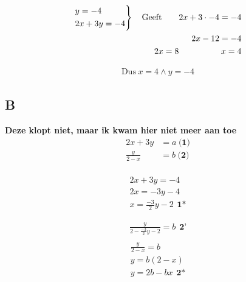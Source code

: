 \documentclass[fleqn]{article}
\begin{document}
\begin{align*} 
\begin{rcases*}
y = -4\\
2x + 3y = -4\\
\end{rcases*}
\hspace{10pt}\text{Geeft}\hspace{20pt}2x + 3\cdot-4 = -4 \\ 
\hspace{50pt}2x -12 = -4 \\ 
\hspace{50pt}2x = 8
\hspace{50pt}x=4
\end{align*}

\begin{align*}
\text{Dus}\hspace{3pt}x = 4 \wedge y=-4
\end{align*}


\subsection{B}
\textbf{\HUGE Deze klopt niet, maar ik kwam hier niet meer aan toe}
\begin{align*}
2x+3y&= a \hspace{3pt}\textbf{(1)}\\ 
\frac{y}{2-x}&=b \hspace{3pt}\textbf{(2)} \\
\end{align*}

\begin{align*}
2x +3y = -4 \\ 
2x = -3y -4 \\ 
x = \frac{-3}{2}y -2 \hspace{5pt}\textbf{1*}
\end{align*}

\begin{align*}
    \frac{y}{2-\frac{-3}{2}y -2} = b\hspace{5pt}\textbf{2'}\\
\end{align*} 
\begin{align*}
\frac{y}{2-x}=b\\ 
y=b(2-x)\\ 
y = 2b - bx  \hspace{5pt}\textbf{2*}\\ 
\end{align*}
\end{document}
